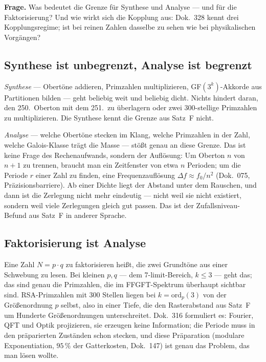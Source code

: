 \textbf{Frage.} Was bedeutet die Grenze für Synthese und Analyse --- und für
die Faktorisierung? Und wie wirkt sich die Kopplung aus: Dok.~328 kennt drei
Kopplungsregime; ist bei reinen Zahlen dasselbe zu sehen wie bei physikalischen
Vorgängen?

\subsection{Synthese ist unbegrenzt, Analyse ist begrenzt}

\emph{Synthese} --- Obertöne addieren, Primzahlen multiplizieren,
GF$(3^k)$-Akkorde aus Partitionen bilden --- geht beliebig weit und beliebig
dicht. Nichts hindert daran, den 250.\ Oberton mit dem 251.\ zu überlagern oder
zwei 300-stellige Primzahlen zu multiplizieren. Die Synthese kennt die Grenze
aus Satz~F nicht.

\emph{Analyse} --- welche Obertöne stecken im Klang, welche Primzahlen in der
Zahl, welche Galois-Klasse trägt die Masse --- stößt genau an diese Grenze.
Das ist keine Frage des Rechenaufwands, sondern der Auflösung: Um Oberton $n$
von $n{+}1$ zu trennen, braucht man ein Zeitfenster von etwa $n$ Perioden; um
die Periode $r$ einer Zahl zu finden, eine Frequenzauflösung
$\Delta f \approx f_0/n^2$ (Dok.~075, Präzisionsbarriere). Ab einer Dichte
liegt der Abstand unter dem Rauschen, und dann ist die Zerlegung nicht mehr
eindeutig --- nicht weil sie nicht existiert, sondern weil viele Zerlegungen
gleich gut passen. Das ist der Zufallsniveau-Befund aus Satz~F in anderer
Sprache.

\subsection{Faktorisierung ist Analyse}

Eine Zahl $N = p \cdot q$ zu faktorisieren heißt, die zwei Grundtöne aus einer
Schwebung zu lesen. Bei kleinen $p, q$ --- dem 7-limit-Bereich, $k \leq 3$ ---
geht das; das sind genau die Primzahlen, die im FFGFT-Spektrum überhaupt
sichtbar sind. RSA-Primzahlen mit 300 Stellen liegen bei
$k = \mathrm{ord}_p(3)$ von der Größenordnung $p$ selbst, also in einer Tiefe,
die den Rasterabstand aus Satz~F um Hunderte Größenordnungen unterschreitet.
Dok.~316 formuliert es: Fourier, QFT und Optik projizieren, sie erzeugen keine
Information; die Periode muss in den präparierten Zuständen schon stecken, und
diese Präparation (modulare Exponentiation, $95\,\%$ der Gatterkosten,
Dok.~147) ist genau das Problem, das man lösen wollte.

